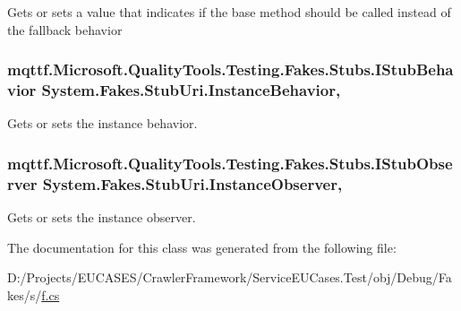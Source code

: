 Gets or sets a value that indicates if the base method should be called instead of the fallback behavior

\hypertarget{class_system_1_1_fakes_1_1_stub_uri_a26b9d0942a6e360402daf64eb8f894d6}{
\subsubsection[{Instance\-Behavior}]{\setlength{\rightskip}{0pt plus 5cm}mqttf.\-Microsoft.\-Quality\-Tools.\-Testing.\-Fakes.\-Stubs.\-I\-Stub\-Behavior System.\-Fakes.\-Stub\-Uri.\-Instance\-Behavior\hspace{0.3cm}{\ttfamily [get]}, {\ttfamily [set]}}}\label{class_system_1_1_fakes_1_1_stub_uri_a26b9d0942a6e360402daf64eb8f894d6}


Gets or sets the instance behavior.

\hypertarget{class_system_1_1_fakes_1_1_stub_uri_a14eb51c4bf9939a214ace78af8a25004}{
\subsubsection[{Instance\-Observer}]{\setlength{\rightskip}{0pt plus 5cm}mqttf.\-Microsoft.\-Quality\-Tools.\-Testing.\-Fakes.\-Stubs.\-I\-Stub\-Observer System.\-Fakes.\-Stub\-Uri.\-Instance\-Observer\hspace{0.3cm}{\ttfamily [get]}, {\ttfamily [set]}}}\label{class_system_1_1_fakes_1_1_stub_uri_a14eb51c4bf9939a214ace78af8a25004}


Gets or sets the instance observer.



The documentation for this class was generated from the following file\-:\begin{DoxyCompactItemize}
\item 
D\-:/\-Projects/\-E\-U\-C\-A\-S\-E\-S/\-Crawler\-Framework/\-Service\-E\-U\-Cases.\-Test/obj/\-Debug/\-Fakes/s/\hyperlink{s_2f_8cs}{f.\-cs}\end{DoxyCompactItemize}
